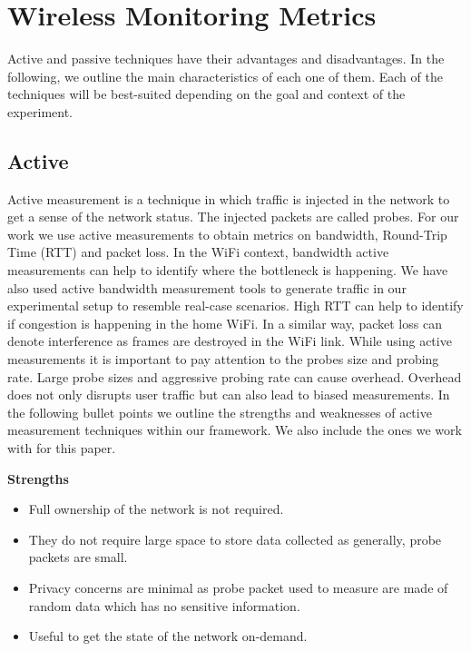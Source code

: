 \section{Wireless Monitoring Metrics}\label{Wireless Monitoring Metrics}

 Active and passive techniques have their advantages and disadvantages. In the following, we outline the main characteristics of each one of them. Each of the techniques will be best-suited depending on the  goal and context of the experiment.

\subsection{Active}

Active measurement is a technique in which traffic is injected in the network to get a sense of the network status. The injected packets are called probes. For our work we use active measurements to obtain metrics on bandwidth, Round-Trip Time (RTT) and packet loss. In the WiFi context, bandwidth active measurements can help to identify where the bottleneck is happening. We have also used active bandwidth measurement tools to generate traffic in our experimental setup to resemble real-case scenarios. High RTT can help to identify if congestion is happening in the home WiFi. In a similar way, packet loss can denote interference as frames are destroyed in the WiFi link. While using active measurements it is  important to pay attention to the probes size and probing rate. Large probe sizes and aggressive probing rate can cause overhead. Overhead does not only disrupts user traffic but can also lead to biased measurements. In the following bullet points we outline the strengths and weaknesses of active measurement techniques within our framework. We also include the ones we work with for this paper.


\textbf{Strengths}
\begin{itemize}
	\item Full ownership of the network is not required.
	\item They do not require large space to store data collected as generally, probe packets are small.
	\item Privacy concerns are minimal as probe packet used to measure are made of random data which has no sensitive information.
	\item Useful to get the state of the network on-demand.
\end{itemize}
	


